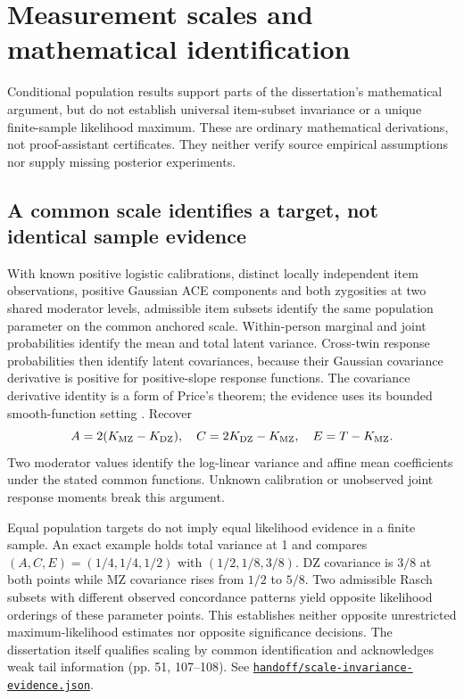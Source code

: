 \documentclass[11pt]{article}
\newcommand{\file}[1]{\href{https://github.com/alectionary/vibe-math/blob/master/formalization/schwabe-psychometric-genetics/#1}{\nolinkurl{#1}}}
\begin{document}
\section{Measurement scales and mathematical identification}\label{sec:theory}
Conditional population results support parts of the dissertation's mathematical argument, but do not establish universal item-subset invariance or a unique finite-sample likelihood maximum. These are ordinary mathematical derivations, not proof-assistant certificates. They neither verify source empirical assumptions nor supply missing posterior experiments.

\subsection{A common scale identifies a target, not identical sample evidence}
With known positive logistic calibrations, distinct locally independent item observations, positive Gaussian ACE components and both zygosities at two shared moderator levels, admissible item subsets identify the same population parameter on the common anchored scale. Within-person marginal and joint probabilities identify the mean and total latent variance. Cross-twin response probabilities then identify latent covariances, because their Gaussian covariance derivative is positive for positive-slope response functions. The covariance derivative identity is a form of Price's theorem; the evidence uses its bounded smooth-function setting \citep{voigtlaender2020}. Recover
\[
 A=2(K_{\rm MZ}-K_{\rm DZ}),\quad C=2K_{\rm DZ}-K_{\rm MZ},\quad E=T-K_{\rm MZ}.
\]
Two moderator values identify the log-linear variance and affine mean coefficients under the stated common functions. Unknown calibration or unobserved joint response moments break this argument.

Equal population targets do not imply equal likelihood evidence in a finite sample. An exact example holds total variance at 1 and compares $(A,C,E)=(1/4,1/4,1/2)$ with $(1/2,1/8,3/8)$. DZ covariance is $3/8$ at both points while MZ covariance rises from $1/2$ to $5/8$. Two admissible Rasch subsets with different observed concordance patterns yield opposite likelihood orderings of these parameter points. This establishes neither opposite unrestricted maximum-likelihood estimates nor opposite significance decisions. The dissertation itself qualifies scaling by common identification and acknowledges weak tail information (pp. 51, 107--108). See \file{handoff/scale-invariance-evidence.json}.
\end{document}
